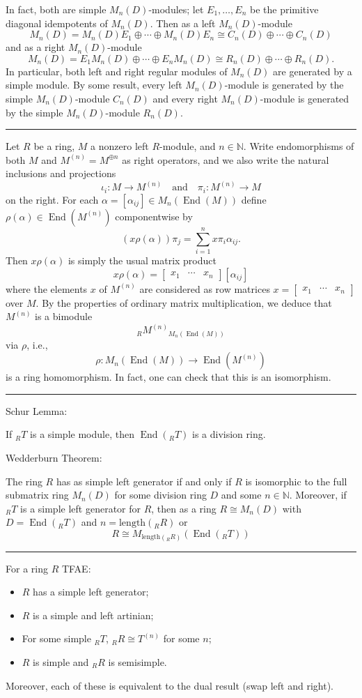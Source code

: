 \documentclass[12pt]{article}
\newcommand{\sepline}{\rule{\textwidth}{0.4pt}}
\theoremstyle{definition}
\newcommand{\isp}[1]{\quad\text{#1}\quad}
\newcommand{\N}{\mathbb{N}}
\newcommand{\<}{\left\langle}
\renewcommand{\>}{\right\rangle}
\newcommand{\iso}{\cong}
\newcommand{\To}{\longrightarrow}
\DeclareMathOperator{\End}{End}
\newcommand{\mat}[1]{\begin{bmatrix}#1\end{bmatrix}}
\renewcommand{\_}[1]{{_{#1}}}
\begin{document}
In fact, both are simple $M_n(D)$-modules; let $E_1, \dots, E_n$ be the primitive diagonal idempotents of $M_n(D)$.
Then as a left $M_n(D)$-module
\[
    M_n(D)
        = M_n(D)E_1 \oplus \cdots \oplus M_n(D)E_n
        \iso C_n(D) \oplus \cdots \oplus C_n(D)
\]
and as a right $M_n(D)$-module
\[
    M_n(D)
        = E_1M_n(D) \oplus \cdots \oplus E_nM_n(D)
        \iso R_n(D) \oplus \cdots \oplus R_n(D).
\]
In particular, both left and right regular modules of $M_n(D)$ are generated by a simple module.
By some result, every left $M_n(D)$-module is generated by the simple $M_n(D)$-module $C_n(D)$ and every right $M_n(D)$-module is generated by the simple $M_n(D)$-module $R_n(D)$.

\sepline

Let $R$ be a ring, $M$ a nonzero left $R$-module, and $n \in \N$.
Write endomorphisms of both $M$ and $M^{(n)} = M^{\oplus n}$ as right operators, and we also write the natural inclusions and projections
\[
    \iota_i : M \to M^{(n)} \isp{and} \pi_i : M^{(n)} \to M
\]
on the right.
For each $\alpha = [\alpha_{ij}] \in M_n(\End(M))$ define $\rho(\alpha) \in \End(M^{(n)})$ componentwise by
\[
    (x\rho(\alpha))\pi_j = \sum_{i=1}^{n} x \pi_i \alpha_{ij}.
\]
Then $x\rho(\alpha)$ is simply the usual matrix product
\[
    x\rho(\alpha) = \mat{x_1 & \cdots & x_n}[\alpha_{ij}]
\]
where the elements $x$ of $M^{(n)}$ are considered as row matrices $x = \mat{x_1 & \cdots & x_n}$ over $M$.
By the properties of ordinary matrix multiplication, we deduce that $M^{(n)}$ is a bimodule
\[
    \_RM^{(n)}{}_{M_n(\End(M))}
\]
via $\rho$, i.e.,
\[
    \rho : M_n(\End(M)) \To \End(M^{(n)})
\]
is a ring homomorphism.
In fact, one can check that this is an isomorphism.

\sepline

Schur Lemma:

If $\_RT$ is a simple module, then $\End(\_RT)$ is a division ring.

Wedderburn Theorem:

The ring $R$ has as simple left generator if and only if $R$ is isomorphic to the full submatrix ring $M_n(D)$ for some division ring $D$ and some $n \in \N$.
Moreover, if $\_RT$ is a simple left generator for $R$, then as a ring $R \iso M_n(D)$ with $D = \End(\_RT)$ and $n = \mathrm{length}(\_RR)$ or
\[
    R \iso M_{\mathrm{length}(\_RR)}(\End(\_RT))
\]

\sepline

For a ring $R$ TFAE:
\begin{itemize}[nosep]
    \item $R$ has a simple left generator;
    \item $R$ is a simple and left artinian;
    \item For some simple $\_RT$, $\_RR \iso T^{(n)}$ for some $n$;
    \item $R$ is simple and $\_RR$ is semisimple.
\end{itemize}
Moreover, each of these is equivalent to the dual result (swap left and right).
\end{document}
